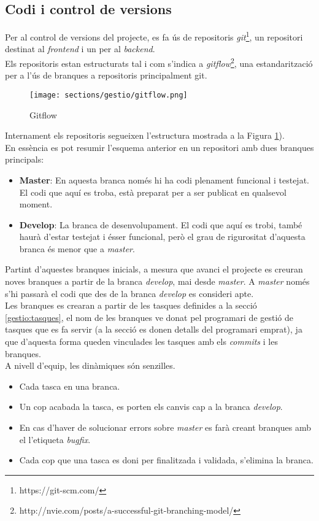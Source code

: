 \subsection{Codi i control de versions}
\label{metodologia:codi_versions}
Per al control de versions del projecte, es fa ús de repositoris \textit{git}\footnote{https://git-scm.com/}, un repositori destinat al \textit{frontend} i un per al \textit{backend}.\\
\newline Els repositoris estan estructurats tal i com s'indica a \textit{gitflow}\footnote{http://nvie.com/posts/a-successful-git-branching-model/}, una estandarització per a l'ús de branques a repositoris principalment git.\\
\begin{figure}[h]
\texttt{[image: sections/gestio/gitflow.png]}
\centering
\caption{Gitflow}
\label{fig:gitflow}
\end{figure}
\clearpage
Internament els repositoris segueixen l'estructura mostrada a la Figura \ref{fig:gitflow}).\\
En essència es pot resumir l'esquema anterior en un repositori amb dues branques principals:
\begin{itemize}
	\item \textbf{Master}: En aquesta branca només hi ha codi plenament funcional i testejat. El codi que aquí es troba, està preparat per a ser publicat en qualsevol moment.
	\item \textbf{Develop}: La branca de desenvolupament. El codi que aquí es trobi, també haurà d'estar testejat i ésser funcional, però el grau de rigurositat d'aquesta branca és menor que a \textit{master}.
\end{itemize}
Partint d'aquestes branques inicials, a mesura que avanci el projecte es creuran noves branques a partir de la branca \textit{develop}, mai desde \textit{master}. A \textit{master} només s'hi passarà el codi que des de la branca \textit{develop} es consideri apte.\\
\newline Les branques es crearan a partir de les tasques definides a la secció \ref{gestio:tasques},
el nom de les branques ve donat pel programari de gestió de tasques que es fa servir (a la secció  es donen detalls del programari emprat), ja que d'aquesta forma queden vinculades les tasques amb els \textit{commits} i les branques.\\
\newline A nivell d'equip, les dinàmiques són senzilles.
\begin{itemize}
    \item Cada tasca en una branca.
    \item Un cop acabada la tasca, es porten els canvis cap a la branca \textit{develop}.
    \item En cas d'haver de solucionar errors sobre \textit{master} es farà creant branques amb el l'etiqueta \textit{bugfix}.
    \item Cada cop que una tasca es doni per finalitzada i validada, s'elimina la branca.
\end{itemize}
